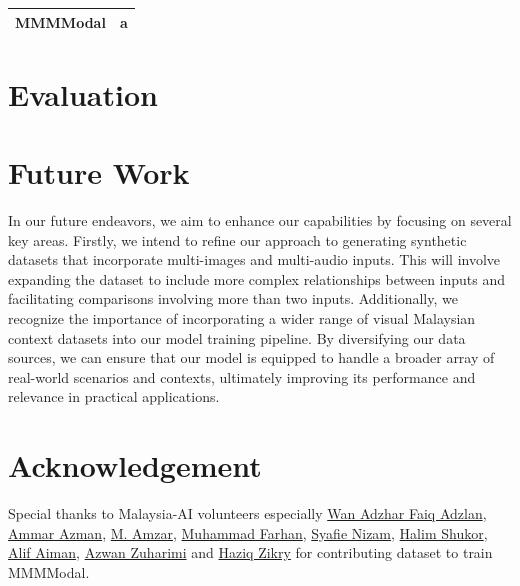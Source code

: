 \documentclass[preprint]{article}
\begin{document}
\begin{table}[hbt]
\begin{tabular}{>{\arraybackslash}m{6.5cm}>{\arraybackslash}m{6.5cm}}
    MMMModal                                           & a                                                                                                                                                                                                                                                                                                                                                                                                                                                                                    \\
    \hline
  \end{tabular}
\end{table}

\newpage

\section{Evaluation}

\section{Future Work}

In our future endeavors, we aim to enhance our capabilities by focusing on several key areas. Firstly, we intend to refine our approach to generating synthetic datasets that incorporate multi-images and multi-audio inputs. This will involve expanding the dataset to include more complex relationships between inputs and facilitating comparisons involving more than two inputs. Additionally, we recognize the importance of incorporating a wider range of visual Malaysian context datasets into our model training pipeline. By diversifying our data sources, we can ensure that our model is equipped to handle a broader array of real-world scenarios and contexts, ultimately improving its performance and relevance in practical applications.

\section{Acknowledgement}

Special thanks to Malaysia-AI volunteers especially \href{https://www.linkedin.com/in/wan-adzhar-faiq-adzlan-19a27baa/}{Wan Adzhar Faiq Adzlan}, \href{https://www.linkedin.com/in/ammar-azman/}{Ammar Azman}, \href{https://www.linkedin.com/in/amzar96/}{M. Amzar}, \href{https://www.linkedin.com/in/muhammad-farhan-helmy-0529501a7/}{Muhammad Farhan}, \href{https://www.linkedin.com/in/syafie-nizam/}{Syafie Nizam}, \href{https://www.linkedin.com/in/halimshukor/}{Halim Shukor}, \href{https://www.linkedin.com/in/alif-aiman-1b334b24b/}{Alif Aiman}, \href{https://www.linkedin.com/in/azwan-zuharimi/}{Azwan Zuharimi} and \href{https://www.linkedin.com/in/haziqzikry/}{Haziq Zikry} for contributing dataset to train MMMModal.
\end{document}
